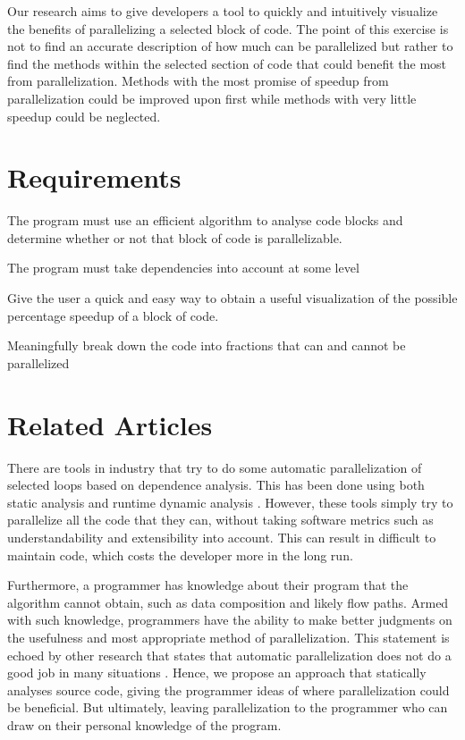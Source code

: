 \documentclass[a4paper]{article}
\begin{document}
Our research aims to give developers a tool to quickly and intuitively
visualize the benefits of parallelizing a selected block of code. The point of this
exercise is not to find an accurate description of how much can be parallelized
but rather to find the methods within the selected section of code that could benefit the most
from parallelization. Methods with the most promise of speedup from parallelization
could be improved upon first while methods with very little speedup could be neglected.

\section{Requirements}
\begin{description}
\item The program must use an efficient algorithm to analyse code blocks
and determine whether or not that block of code is parallelizable.
\item The program must take dependencies into account at some level
\item Give the user a quick and easy way to obtain a useful visualization
of the possible percentage speedup of a block of code.
\item Meaningfully break down the code into fractions that can and cannot
be parallelized
\end{description}

\section{Related Articles}
There are tools in industry that try to do some automatic parallelization
of selected loops based on dependence analysis. This has been done using both static
analysis \cite{helixProject} and runtime dynamic analysis \cite{1207020} 
\cite{Rus05hybriddependence}. However, these tools simply try to
parallelize all the code that they can, without taking software metrics such as
understandability and extensibility into account. This can result in difficult
to maintain code, which costs the developer more in the long run.

Furthermore, a programmer has knowledge about their program that the algorithm cannot
obtain, such as data composition and likely flow paths. Armed with such
knowledge, programmers have the ability to make better judgments on the
usefulness and most appropriate method of parallelization. This statement is
echoed by other research that states that automatic parallelization does not do
a good job in many situations \cite{5470884}. Hence, we propose an approach that
statically analyses source code, giving the programmer ideas of where
parallelization could be beneficial. But ultimately, leaving parallelization to
the programmer who can draw on their personal knowledge of the program.
\end{document}
